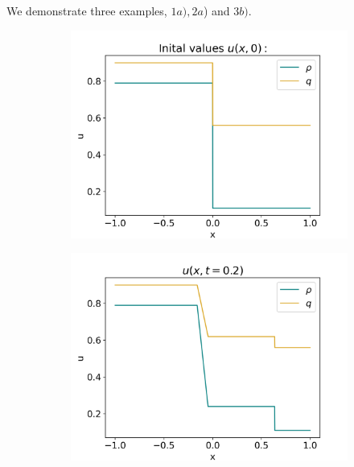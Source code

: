 \documentclass[10pt]{article}
\numberwithin{equation}{section}
\begin{document}
We demonstrate three examples, $1a), 2a$) and $3b)$. 
\begin{figure}[H]
     \centering
     \begin{subfigure}[t]{0.35\textwidth}
         \centering
         \includegraphics[width=\textwidth]{Figures/Model/Plots/Sys1aIV.png}
     \end{subfigure}
     \begin{subfigure}[t]{0.35\textwidth}
         \centering
         \includegraphics[width=\textwidth]{Figures/Model/Plots/Sys1aAtTime.png}
     \end{subfigure}
     \hfill
     \begin{subfigure}[b]{0.35\textwidth}
         \centering

\end{subfigure}
\end{figure}
\end{document}
